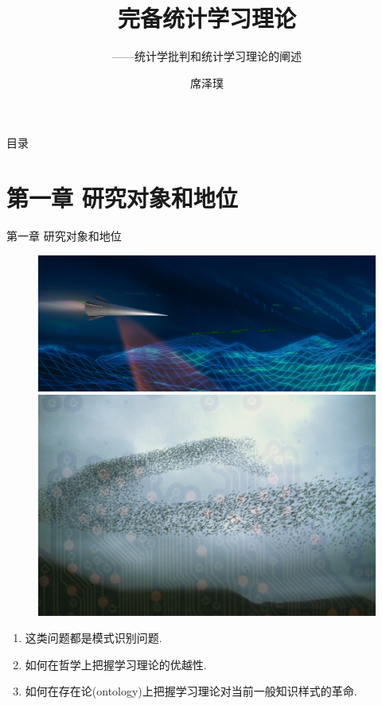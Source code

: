 \documentclass[compress,10pt,dvipsnames,notheorems]{beamer} %
\title{完备统计学习理论}
\subtitle{——统计学批判和统计学习理论的阐述}
\author{席泽璞}
\begin{document}
	
\begin{frame} %
	\titlepage
\end{frame}

{
\begin{frame}[noframenumbering]{目录} %
	\tableofcontents[hideallsubsections]
\end{frame}
}



\section{第一章 研究对象和地位}
\begin{frame}{第一章 研究对象和地位}
\begin{figure}
\centering
\includegraphics[width=.5\linewidth]{Imgs/mission-campaign.png}
\includegraphics[width=.5\linewidth]{Imgs/Swarm-2.jpg}
\end{figure}
\begin{solu}
\begin{enumerate}
\item 这类问题都是模式识别问题.
\item 如何在哲学上把握学习理论的优越性.
\item 如何在存在论(ontology)上把握学习理论对当前一般知识样式的革命.
\end{enumerate}
\end{solu}
\end{frame}
\end{document}
